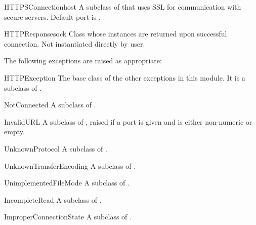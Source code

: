\begin{classdesc}{HTTPSConnection}{host}
A subclass of  that uses SSL for communication with
secure servers.  Default port is .
\end{classdesc}

\begin{classdesc}{HTTPResponse}{sock}
Class whose instances are returned upon successful connection.  Not
instantiated directly by user.
\end{classdesc}

The following exceptions are raised as appropriate:

\begin{excdesc}{HTTPException}
The base class of the other exceptions in this module.  It is a
subclass of .
\end{excdesc}

\begin{excdesc}{NotConnected}
A subclass of .
\end{excdesc}

\begin{excdesc}{InvalidURL}
A subclass of , raised if a port is given and is
either non-numeric or empty.
\end{excdesc}

\begin{excdesc}{UnknownProtocol}
A subclass of .
\end{excdesc}

\begin{excdesc}{UnknownTransferEncoding}
A subclass of .
\end{excdesc}

\begin{excdesc}{UnimplementedFileMode}
A subclass of .
\end{excdesc}

\begin{excdesc}{IncompleteRead}
A subclass of .
\end{excdesc}

\begin{excdesc}{ImproperConnectionState}
A subclass of .
\end{excdesc}

